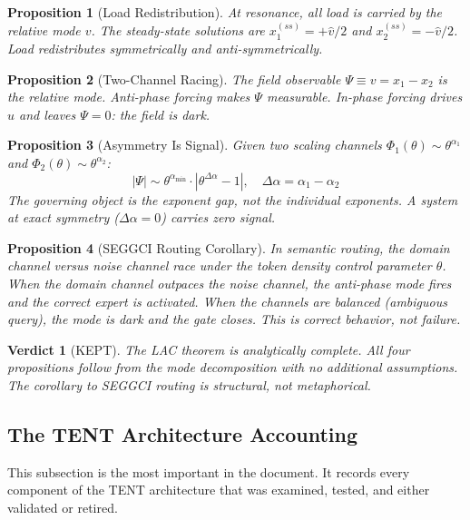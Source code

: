 \documentclass[11pt]{article}
\newtheorem{proposition}{Proposition}
\newtheorem{verdict}{Verdict}
\begin{document}
\begin{proposition}[Load Redistribution]
At resonance, all load is carried by the relative mode $v$. The steady-state solutions are $x_1^{(ss)} = +\hat{v}/2$ and $x_2^{(ss)} = -\hat{v}/2$. Load redistributes symmetrically and anti-symmetrically.
\end{proposition}

\begin{proposition}[Two-Channel Racing]
The field observable $\Psi \equiv v = x_1 - x_2$ is the relative mode. Anti-phase forcing makes $\Psi$ measurable. In-phase forcing drives $u$ and leaves $\Psi = 0$: the field is dark.
\end{proposition}

\begin{proposition}[Asymmetry Is Signal]
Given two scaling channels $\Phi_1(\theta) \sim \theta^{\alpha_1}$ and $\Phi_2(\theta) \sim \theta^{\alpha_2}$:
\begin{equation}
  |\Psi| \sim \theta^{\alpha_{\min}} \cdot |\theta^{\Delta\alpha} - 1|, \quad \Delta\alpha = \alpha_1 - \alpha_2
\end{equation}
The governing object is the exponent gap, not the individual exponents. A system at exact symmetry ($\Delta\alpha = 0$) carries zero signal.
\end{proposition}

\begin{proposition}[SEGGCI Routing Corollary]
In semantic routing, the domain channel versus noise channel race under the token density control parameter $\theta$. When the domain channel outpaces the noise channel, the anti-phase mode fires and the correct expert is activated. When the channels are balanced (ambiguous query), the mode is dark and the gate closes. This is correct behavior, not failure.
\end{proposition}

\begin{verdict}[\textcolor{keepgreen}{KEPT}]
The LAC theorem is analytically complete. All four propositions follow from the mode decomposition with no additional assumptions. The corollary to SEGGCI routing is structural, not metaphorical.
\end{verdict}

\subsection{The TENT Architecture Accounting}

This subsection is the most important in the document. It records every component of the TENT architecture that was examined, tested, and either validated or retired.
\end{document}
